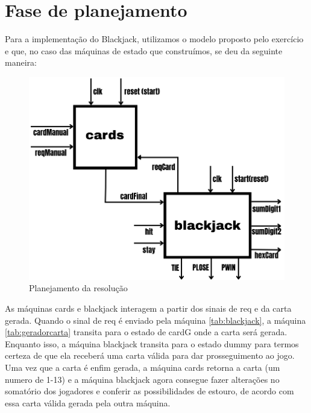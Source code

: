 \documentclass[oneside]{uffstex}
\begin{document}
\section{Fase de planejamento}
Para a implementação do Blackjack, utilizamos o modelo proposto pelo exercício e que, no caso das máquinas de estado que construímos, se deu da seguinte maneira:
\begin{figure}[H]
    \centering
    \includegraphics[width=1.0\linewidth]{planejamento_cards_blackjack.png}
    \caption{Planejamento da resolução}
    \label{fig:cards_blackjack}
\end{figure}
As máquinas cards e blackjack interagem a partir dos sinais de req e da carta gerada. Quando o sinal de req é enviado pela máquina \ref{tab:blackjack}, a máquina \ref{tab:geradorcarta} transita para o estado de cardG onde a carta será gerada. Enquanto isso, a máquina blackjack transita para o estado dummy para termos certeza de que ela receberá uma carta válida para dar prosseguimento ao jogo. Uma vez que a carta é enfim gerada, a máquina cards retorna a carta (um numero de 1-13) e a máquina blackjack agora consegue fazer alterações no somatório dos jogadores e conferir as possibilidades de estouro, de acordo com essa carta válida gerada pela outra máquina.
\end{document}
